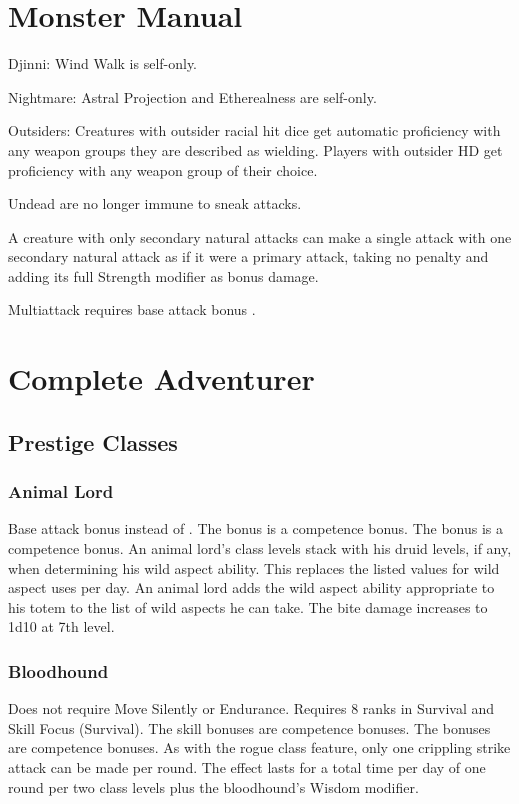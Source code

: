 \section{Monster Manual}
\begin{itemize*}
\item Djinni: Wind Walk is self-only.
\item Nightmare: Astral Projection and Etherealness are self-only.
\item Outsiders: Creatures with outsider racial hit dice get automatic proficiency with any weapon groups they are described as wielding. Players with outsider HD get proficiency with any weapon group of their choice.
\item Undead are no longer immune to sneak attacks.
\item A creature with only secondary natural attacks can make a single attack with one secondary natural attack as if it were a primary attack, taking no penalty and adding its full Strength modifier as bonus damage.
\item Multiattack requires base attack bonus .
\end{itemize*}

\section{Complete Adventurer}
\subsection{Prestige Classes}
\subsubsection{Animal Lord}
 Base attack bonus  instead of .
 The bonus is a competence bonus.
 The bonus is a competence bonus.
 An animal lord's class levels stack with his druid levels, if any, when determining his wild aspect ability. This replaces the listed values for wild aspect uses per day. An animal lord adds the wild aspect ability appropriate to his totem to the list of wild aspects he can take.
 The bite damage increases to 1d10 at 7th level.
\subsubsection{Bloodhound}
 Does not require Move Silently or Endurance. Requires 8 ranks in Survival and Skill Focus (Survival).
 The skill bonuses are competence bonuses.
 The bonuses are competence bonuses.
 As with the rogue class feature, only one crippling strike attack can be made per round.
 The effect lasts for a total time per day of one round per two class levels plus the bloodhound's Wisdom modifier.
